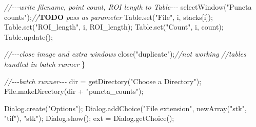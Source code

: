 \documentclass[
  12pt,
  a4paper,
]{book}
\newenvironment{Shaded}{}{}
\newcommand{\AlertTok}[1]{\textcolor[rgb]{1.00,0.00,0.00}{\textbf{#1}}}
\newcommand{\CommentTok}[1]{\textcolor[rgb]{0.38,0.63,0.69}{\textit{#1}}}
\newcommand{\NormalTok}[1]{#1}
\newcommand{\OperatorTok}[1]{\textcolor[rgb]{0.40,0.40,0.40}{#1}}
\newcommand{\StringTok}[1]{\textcolor[rgb]{0.25,0.44,0.63}{#1}}
\begin{document}
\begin{Shaded}
\begin{Highlighting}[]
    \CommentTok{//{-}{-}{-}write filename, point count, ROI length to Table{-}{-}{-}}
\NormalTok{    selectWindow}\OperatorTok{(}\StringTok{"Puncta counts"}\OperatorTok{);}\CommentTok{//}\AlertTok{TODO}\CommentTok{ pass as parameter}
\NormalTok{    Table}\OperatorTok{.}\NormalTok{set}\OperatorTok{(}\StringTok{"File"}\OperatorTok{,}\NormalTok{ i}\OperatorTok{,}\NormalTok{ stacks}\OperatorTok{[}\NormalTok{i}\OperatorTok{]);}
\NormalTok{    Table}\OperatorTok{.}\NormalTok{set}\OperatorTok{(}\StringTok{"ROI\_length"}\OperatorTok{,}\NormalTok{ i}\OperatorTok{,}\NormalTok{ ROI\_length}\OperatorTok{);}
\NormalTok{    Table}\OperatorTok{.}\NormalTok{set}\OperatorTok{(}\StringTok{"Count"}\OperatorTok{,}\NormalTok{ i}\OperatorTok{,}\NormalTok{ count}\OperatorTok{);}
\NormalTok{    Table}\OperatorTok{.}\NormalTok{update}\OperatorTok{();}
    
    \CommentTok{//{-}{-}{-}close image and extra windows}
\NormalTok{    close}\OperatorTok{(}\StringTok{"duplicate"}\OperatorTok{);}\CommentTok{//not working}
    \CommentTok{//tables handled in batch runner}
\OperatorTok{\}}

\CommentTok{//{-}{-}{-}batch runner{-}{-}{-}}
\NormalTok{dir }\OperatorTok{=}\NormalTok{ getDirectory}\OperatorTok{(}\StringTok{"Choose a Directory"}\OperatorTok{);}
\NormalTok{File}\OperatorTok{.}\NormalTok{makeDirectory}\OperatorTok{(}\NormalTok{dir }\OperatorTok{+} \StringTok{"puncta\_counts"}\OperatorTok{);}

\NormalTok{Dialog}\OperatorTok{.}\NormalTok{create}\OperatorTok{(}\StringTok{"Options"}\OperatorTok{);}
\NormalTok{Dialog}\OperatorTok{.}\NormalTok{addChoice}\OperatorTok{(}\StringTok{"File extension"}\OperatorTok{,}\NormalTok{ newArray}\OperatorTok{(}\StringTok{"stk"}\OperatorTok{,} \StringTok{"tif"}\OperatorTok{),} \StringTok{"stk"}\OperatorTok{);}
\NormalTok{Dialog}\OperatorTok{.}\NormalTok{show}\OperatorTok{();}
\NormalTok{ext }\OperatorTok{=}\NormalTok{ Dialog}\OperatorTok{.}\NormalTok{getChoice}\OperatorTok{();}


\end{Highlighting}
\end{Shaded}
\end{document}
